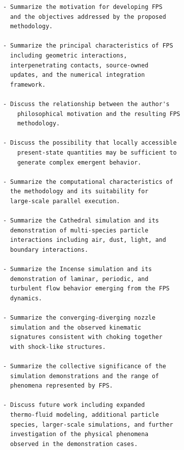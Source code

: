 \begin{verbatim}
        - Summarize the motivation for developing FPS
          and the objectives addressed by the proposed
          methodology.

        - Summarize the principal characteristics of FPS
          including geometric interactions,
          interpenetrating contacts, source-owned
          updates, and the numerical integration
          framework.

		- Discuss the relationship between the author's
  			philosophical motivation and the resulting FPS
  			methodology.

		- Discuss the possibility that locally accessible
  			present-state quantities may be sufficient to
  			generate complex emergent behavior.

        - Summarize the computational characteristics of
          the methodology and its suitability for
          large-scale parallel execution.

        - Summarize the Cathedral simulation and its
          demonstration of multi-species particle
          interactions including air, dust, light, and
          boundary interactions.

        - Summarize the Incense simulation and its
          demonstration of laminar, periodic, and
          turbulent flow behavior emerging from the FPS
          dynamics.

        - Summarize the converging-diverging nozzle
          simulation and the observed kinematic
          signatures consistent with choking together
          with shock-like structures.

        - Summarize the collective significance of the
          simulation demonstrations and the range of
          phenomena represented by FPS.

        - Discuss future work including expanded
          thermo-fluid modeling, additional particle
          species, larger-scale simulations, and further
          investigation of the physical phenomena
          observed in the demonstration cases.



\end{verbatim}

